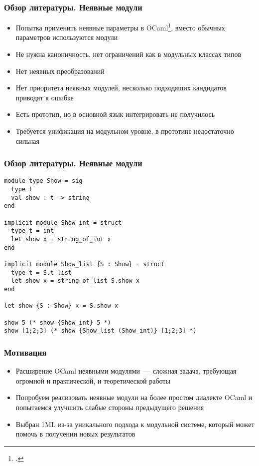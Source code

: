 \documentclass{beamer}
\begin{document}
\begin{frame}\frametitle{Обзор литературы. Неявные модули}
\begin{itemize}
  \item Попытка применить неявные параметры в OCaml\footcite{white}, вместо обычных параметров используются модули
  \item Не нужна каноничность, нет ограничений как в модульных классах типов
  \item Нет неявных преобразований
  \item Нет приоритета неявных модулей, несколько подходящих кандидатов приводят к ошибке
  \item Есть прототип, но в основной язык интегрировать не получилось
  \item Требуется унификация на модульном уровне, в прототипе недостаточно сильная
\end{itemize}
\end{frame}

\lstset{language=caml}
\begin{frame}[fragile]\frametitle{Обзор литературы. Неявные модули}
\begin{lstlisting}
module type Show = sig
  type t
  val show : t -> string
end

implicit module Show_int = struct
  type t = int
  let show x = string_of_int x
end

implicit module Show_list {S : Show} = struct
  type t = S.t list
  let show x = string_of_list S.show x
end

let show {S : Show} x = S.show x

show 5 (* show {Show_int} 5 *)
show [1;2;3] (* show {Show_list (Show_int)} [1;2;3] *)
\end{lstlisting}
\end{frame}

\begin{frame}\frametitle{Мотивация}
\begin{itemize}
  \item Расширение OCaml неявными модулями~--- сложная задача, требующая огромной и практической, и теоретической работы
  \item Попробуем реализовать неявные модули на более простом диалекте OCaml и попытаемся улучшить слабые стороны предыдущего решения
  \item Выбран 1ML из-за уникального подхода к модульной системе, который может помочь в получении новых результатов
\end{itemize}
\end{frame}
\end{document}
